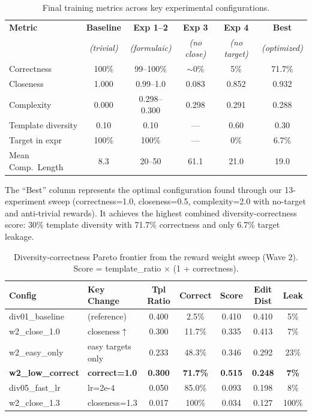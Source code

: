 \documentclass[11pt, letterpaper]{article}
\begin{document}
\begin{table}[H]
\centering
\caption{Final training metrics across key experimental configurations.}
\label{tab:results}
\begin{tabular}{lccccc}
\toprule
\textbf{Metric} & \textbf{Baseline} & \textbf{Exp 1--2} & \textbf{Exp 3} & \textbf{Exp 4} & \textbf{Best} \\
 & \textit{(trivial)} & \textit{(formulaic)} & \textit{(no close)} & \textit{(no target)} & \textit{(optimized)} \\
\midrule
Correctness        & 100\%  & 99--100\% & $\sim$0\% & 5\%  & 71.7\% \\
Closeness           & 1.000  & 0.99--1.0 & 0.083     & 0.852 & 0.932 \\
Complexity          & 0.000  & 0.298--0.300 & 0.298  & 0.291 & 0.288 \\
Template diversity  & 0.10   & 0.10       & ---       & 0.60  & 0.30 \\
Target in expr      & 100\%  & 100\%      & ---       & 0\%   & 6.7\% \\
Mean Comp.\ Length  & 8.3    & 20--50     & 61.1      & 21.0  & 19.0 \\
\bottomrule
\end{tabular}
\end{table}

The ``Best'' column represents the optimal configuration found through our 13-experiment sweep (correctness=1.0, closeness=0.5, complexity=2.0 with no-target and anti-trivial rewards). It achieves the highest combined diversity-correctness score: 30\% template diversity with 71.7\% correctness and only 6.7\% target leakage.

\begin{table}[H]
\centering
\caption{Diversity-correctness Pareto frontier from the reward weight sweep (Wave 2). Score = template\_ratio $\times$ (1 + correctness).}
\label{tab:pareto}
\begin{tabular}{llccccc}
\toprule
\textbf{Config} & \textbf{Key Change} & \textbf{Tpl Ratio} & \textbf{Correct} & \textbf{Score} & \textbf{Edit Dist} & \textbf{Leak} \\
\midrule
div01\_baseline   & (reference)         & 0.400 & 2.5\%   & 0.410 & 0.410 & 5\% \\
w2\_close\_1.0   & closeness$\uparrow$ & 0.300 & 11.7\%  & 0.335 & 0.413 & 7\% \\
w2\_easy\_only    & easy targets only   & 0.233 & 48.3\%  & 0.346 & 0.292 & 23\% \\
\textbf{w2\_low\_correct} & \textbf{correct=1.0} & \textbf{0.300} & \textbf{71.7\%} & \textbf{0.515} & \textbf{0.248} & \textbf{7\%} \\
div05\_fast\_lr   & lr=2e-4             & 0.050 & 85.0\%  & 0.093 & 0.198 & 8\% \\
w2\_close\_1.3   & closeness=1.3       & 0.017 & 100\%   & 0.034 & 0.127 & 100\% \\
\bottomrule
\end{tabular}
\end{table}
\end{document}
